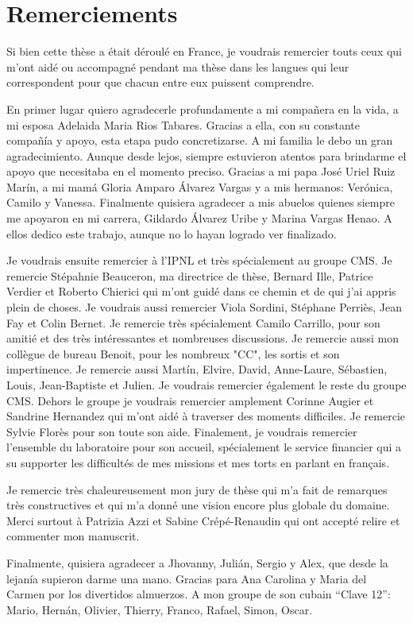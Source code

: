 \begingroup
\let\clearpage\relax
\let\cleardoublepage\relax
\let\cleardoublepage\relax


\begin{otherlanguage}{francais}
\chapter*{Remerciements}

Si bien cette thèse a était déroulé en France, je voudrais remercier touts ceux qui m'ont aidé ou accompagné pendant ma thèse dans les langues qui leur correspondent pour que chacun entre eux puissent comprendre. 

En primer lugar quiero agradecerle profundamente a mi compañera en la vida, a mi esposa Adelaida Maria Rios Tabares. Gracias a ella, con su constante compañía y apoyo, esta etapa pudo concretizarse. A mi familia le debo un gran agradecimiento. Aunque desde lejos, siempre estuvieron atentos para brindarme el apoyo que necesitaba en el momento preciso. Gracias a mi papa José Uriel Ruiz Marín, a mi mamá Gloria Amparo Álvarez Vargas y a mis hermanos: Verónica, Camilo y Vanessa. Finalmente quisiera agradecer a mis abuelos quienes siempre me apoyaron en mi carrera, Gildardo Álvarez Uribe y Marina Vargas Henao. A ellos dedico este trabajo, aunque no lo hayan logrado ver finalizado.

Je voudrais ensuite remercier à l'IPNL et très spécialement au groupe CMS. Je remercie Stépahnie Beauceron, ma directrice de thèse, Bernard Ille, Patrice Verdier et Roberto Chierici qui m'ont guidé dans ce chemin et de qui j'ai appris plein de choses. Je voudrais aussi remercier Viola Sordini, Stéphane Perriès, Jean Fay et Colin Bernet. Je remercie très spécialement Camilo Carrillo, pour son amitié et des très intéressantes et nombreuses discussions. Je remercie aussi mon collègue de bureau Benoit, pour les nombreux "CC", les sortis et son impertinence. Je remercie aussi Martín, Elvire, David, Anne-Laure, Sébastien, Louis, Jean-Baptiste et Julien. Je voudrais remercier également le reste du groupe CMS. Dehors le groupe je voudrais remercier amplement Corinne Augier et Sandrine Hernandez qui m'ont aidé à traverser des moments difficiles. Je remercie Sylvie Florès pour son toute son aide. Finalement, je voudrais remercier l'ensemble du laboratoire pour son accueil, spécialement le service financier qui a su supporter les difficultés de mes missions et mes torts en parlant en français.  

Je remercie très chaleureusement mon jury de thèse qui m'a fait de remarques très constructives et qui m'a donné une vision encore plus globale du domaine. Merci surtout à Patrizia Azzi et Sabine Crépé-Renaudin qui ont accepté relire et commenter mon manuscrit. 

Finalmente, quisiera agradecer a Jhovanny, Julián, Sergio y Alex, que desde la lejanía supieron darme una mano. Gracias para Ana Carolina y Maria del Carmen por los divertidos almuerzos. A mon groupe de son cubain ``Clave 12'': Mario, Hernán, Olivier, Thierry, Franco, Rafael, Simon, Oscar. 

\end{otherlanguage}

\endgroup